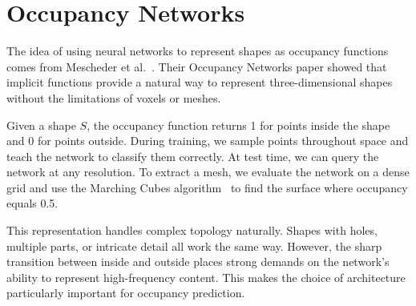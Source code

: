 \section{Occupancy Networks}

The idea of using neural networks to represent shapes as occupancy functions comes from Mescheder et al.~\cite{mescheder2019occupancy}. Their Occupancy Networks paper showed that implicit functions provide a natural way to represent three-dimensional shapes without the limitations of voxels or meshes.

Given a shape $S$, the occupancy function returns 1 for points inside the shape and 0 for points outside. During training, we sample points throughout space and teach the network to classify them correctly. At test time, we can query the network at any resolution. To extract a mesh, we evaluate the network on a dense grid and use the Marching Cubes algorithm~\cite{lorensen1987marching} to find the surface where occupancy equals 0.5.

This representation handles complex topology naturally. Shapes with holes, multiple parts, or intricate detail all work the same way. However, the sharp transition between inside and outside places strong demands on the network's ability to represent high-frequency content. This makes the choice of architecture particularly important for occupancy prediction.

